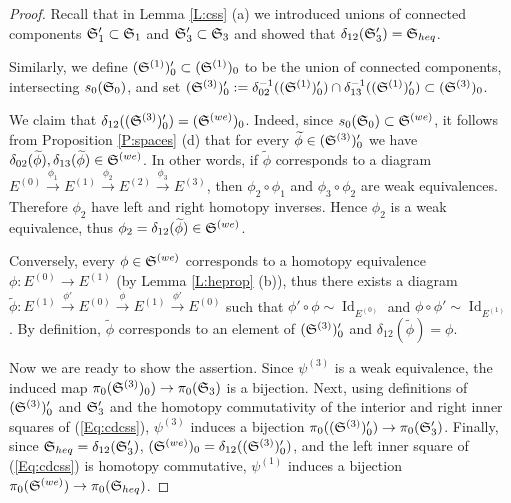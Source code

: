 \documentclass[12pt]{amsart}
\theoremstyle{plain}
\newtheorem{Lem}[Thm]{Lemma}
\theoremstyle{definition}
\numberwithin{equation}{section}
\newcommand{\cal}[1]{\mathcal{#1}}
\newcommand{\C}[1]{\cal#1}
\newcommand{\form}[1]{(\ref{Eq:#1})}
\newcommand{\lra}{\longrightarrow}
\newcommand{\wt}{\widetilde}
\newcommand{\dt}{\delta}
\newcommand{\rl}[1]{Lemma \ref{L:#1}}
\newcommand{\rp}[1]{Proposition \ref{P:#1}}
\newcommand{\Id}{\operatorname{Id}}
\renewcommand{\S}{\frak{S}}
\begin{document}
\begin{proof}
Recall that in \rl{css} (a) we introduced unions of connected
components $\S'_1\subset\S_1$ and $\S'_3\subset\S_3$ and showed
that $\dt_{12}(\S'_3)=\S_{heq}$.

Similarly, we define $(\S^{(1)})'_0\subset (\S^{(1)})_0$ to be the
union of connected components, intersecting $s_0(\S_0)$, and set
$(\S^{(3)})'_0:=\dt_{02}^{-1}((\S^{(1)})'_0)\cap\dt_{13}^{-1}((\S^{(1)})'_0)
\subset(\S^{(3)})_0$.

We claim that $\dt_{12}((\S^{(3)})'_0)=(\S^{(we)})_0$. Indeed,
since $s_0(\S_0)\subset\S^{(we)}$, it follows from \rp{spaces} (d)
that for every $\wt{\phi}\in(\S^{(3)})'_0$ we have
$\dt_{02}(\wt{\phi}),\dt_{13}(\wt{\phi})\in \S^{(we)}$. In other
words, if $\wt{\phi}$ corresponds to a diagram
$E^{(0)}\overset{\phi_1}{\lra}E^{(1)}\overset{\phi_2}{\lra}E^{(2)}
\overset{\phi_3}{\lra}E^{(3)}$, then $\phi_2\circ\phi_1$ and
$\phi_3\circ\phi_2$ are weak equivalences. Therefore $\phi_2$ have
left and right homotopy inverses. Hence $\phi_2$ is a weak
equivalence, thus $\phi_2=\dt_{12}(\wt{\phi})\in \S^{(we)}$.

Conversely, every $\phi\in \S^{(we)}$ corresponds to a homotopy
equivalence $\phi:E^{(0)}\to E^{(1)}$ (by \rl{heprop} (b)), thus
there exists a diagram
$\wt{\phi}:E^{(1)}\overset{\phi'}{\lra}E^{(0)}\overset{\phi}{\lra}E^{(1)}
\overset{\phi'}{\lra}E^{(0)}$ such that
$\phi'\circ\phi\sim\Id_{E^{(0)}}$ and
$\phi\circ\phi'\sim\Id_{E^{(1)}}$. By definition, $\wt{\phi}$
corresponds to an element of $(\S^{(3)})'_0$ and
$\dt_{12}(\wt{\phi})=\phi$.

Now we are ready to show the assertion. Since $\psi^{(3)}$ is a
weak equivalence, the induced map
$\pi_0(\S^{(3)})_0)\to\pi_0(\S_3)$ is a bijection. Next, using
definitions of $(\S^{(3)})'_0$ and $\S'_3$ and the homotopy
commutativity of the interior and right inner squares of
\form{cdcss}, $\psi^{(3)}$ induces a bijection
$\pi_0((\S^{(3)})'_0)\to\pi_0(\S'_3)$. Finally, since
$\S_{heq}=\dt_{12}(\S'_3)$,
$(\S^{(we)})_0=\dt_{12}((\S^{(3)})'_0)$, and the left inner square
of \form{cdcss} is homotopy commutative, $\psi^{(1)}$ induces a
bijection $\pi_0(\S^{(we)})\to\pi_0(\S_{heq})$.
\end{proof}


%
\end{document}
